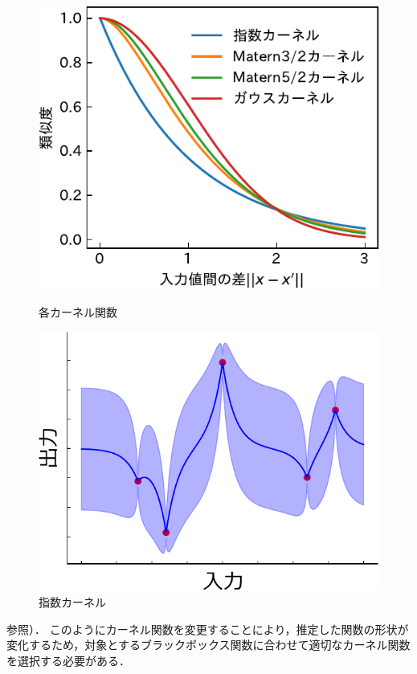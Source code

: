\documentclass[twocolumn]{ltjarticle}
\begin{document}
\begin{figure}[H]
	\begin{minipage}[t]{0.5\columnwidth}
		\centering
		\includegraphics[width=\columnwidth]{./figures/kernel-crop.pdf}
		\vspace*{-0.8cm}
		\caption{各カーネル関数} \label{fig:matern_graph}
	\end{minipage}
	\begin{minipage}[t]{0.47\columnwidth}
		\centering
		\includegraphics[width=\columnwidth]{figures/material_8_exp.pdf}
		\vspace*{-0.8cm}
		\caption{指数カーネル} \label{fig:exp_kernel}
	\end{minipage}
\end{figure}
\noindent
参照）．
このようにカーネル関数を変更することにより，推定した関数の形状が変化するため，対象とするブラックボックス関数に合わせて適切なカーネル関数を選択する必要がある．
\end{document}
